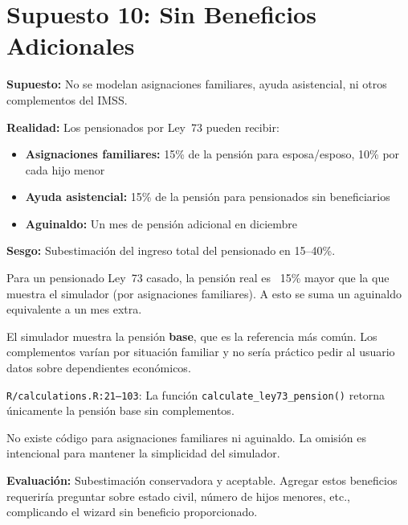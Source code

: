 \documentclass[11pt,a4paper]{report}
\begin{document}
\section{Supuesto 10: Sin Beneficios Adicionales}

\begin{tcolorbox}[colback=blue!5!white, colframe=blue!75!black, title=\textbf{Definici\'on Formal}]
\textbf{Supuesto:} No se modelan asignaciones familiares, ayuda asistencial, ni otros complementos del IMSS.

\textbf{Realidad:} Los pensionados por Ley~73 pueden recibir:
\begin{itemize}
  \item \textbf{Asignaciones familiares:} 15\% de la pensi\'on para esposa/esposo, 10\% por cada hijo menor
  \item \textbf{Ayuda asistencial:} 15\% de la pensi\'on para pensionados sin beneficiarios
  \item \textbf{Aguinaldo:} Un mes de pensi\'on adicional en diciembre
\end{itemize}

\textbf{Sesgo:} Subestimaci\'on del ingreso total del pensionado en 15--40\%.
\end{tcolorbox}

\begin{tcolorbox}[colback=green!5!white, colframe=green!50!black, title=\textbf{Intuici\'on}]
Para un pensionado Ley~73 casado, la pensi\'on real es ~15\% mayor que la que muestra el simulador (por asignaciones familiares). A esto se suma un aguinaldo equivalente a un mes extra.

El simulador muestra la pensi\'on \textbf{base}, que es la referencia m\'as com\'un. Los complementos var\'ian por situaci\'on familiar y no ser\'ia pr\'actico pedir al usuario datos sobre dependientes econ\'omicos.
\end{tcolorbox}

\begin{tcolorbox}[colback=orange!5!white, colframe=orange!75!black, title=\textbf{Aplicaci\'on en C\'odigo}]
\texttt{R/calculations.R:21--103}: La funci\'on \texttt{calculate\_ley73\_pension()} retorna \'unicamente la pensi\'on base sin complementos.

No existe c\'odigo para asignaciones familiares ni aguinaldo. La omisi\'on es intencional para mantener la simplicidad del simulador.

\textbf{Evaluaci\'on:} Subestimaci\'on conservadora y aceptable. Agregar estos beneficios requerir\'ia preguntar sobre estado civil, n\'umero de hijos menores, etc., complicando el wizard sin beneficio proporcionado.
\end{tcolorbox}
\end{document}
